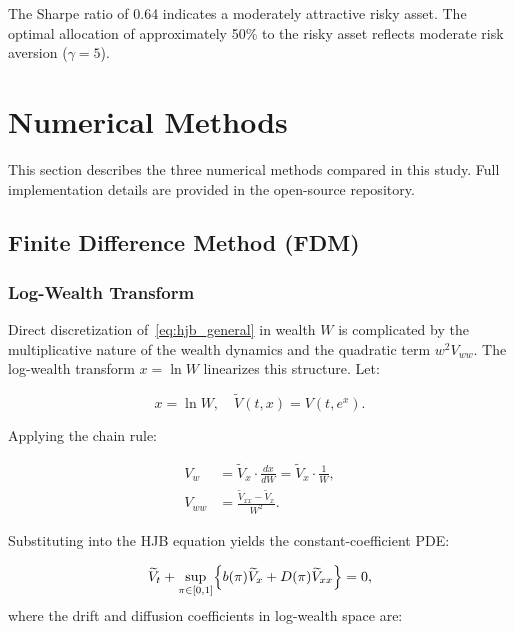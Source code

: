 \documentclass[12pt,a4paper]{article}
\begin{document}
The Sharpe ratio of 0.64 indicates a moderately attractive risky asset. The optimal allocation of approximately 50\% to the risky asset reflects moderate risk aversion ($\gamma = 5$).

\section{Numerical Methods}
\label{sec:methods}

This section describes the three numerical methods compared in this study. Full implementation details are provided in the open-source repository.

\subsection{Finite Difference Method (FDM)}
\label{sec:fdm}

\subsubsection{Log-Wealth Transform}

Direct discretization of~\eqref{eq:hjb_general} in wealth $W$ is complicated by the multiplicative nature of the wealth dynamics and the quadratic term $w^2 V_{ww}$. The log-wealth transform $x = \ln W$ linearizes this structure. Let:

\begin{equation}
\label{eq:log_transform}
x = \ln W, \quad \widetilde{V}(t, x) = V(t, e^x).
\end{equation}

Applying the chain rule:

\begin{align}
V_w &= \widetilde{V}_x \cdot \frac{dx}{dW} = \widetilde{V}_x \cdot \frac{1}{W}, \label{eq:v_w_transform}\\
V_{ww} &= \frac{\widetilde{V}_{xx} - \widetilde{V}_x}{W^2}. \label{eq:v_ww_transform}
\end{align}

Substituting into the HJB equation yields the constant-coefficient PDE:

\begin{equation}
\label{eq:hjb_log}
\widetilde{V}_t + \sup_{\pi \in [0,1]} \Bigl\{ b(\pi) \widetilde{V}_x + D(\pi) \widetilde{V}_{xx} \Bigr\} = 0,
\end{equation}
where the drift and diffusion coefficients in log-wealth space are:
\end{document}
